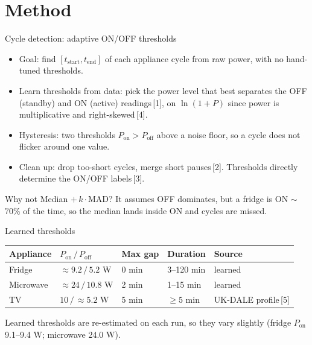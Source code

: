 \section{Method}

\begin{frame}{Cycle detection: adaptive ON/OFF thresholds}
  \small
  \setlength{\itemsep}{2pt}
  \begin{itemize}
    \item \alert{Goal:} find $[t_{\mathrm{start}}, t_{\mathrm{end}}]$ of each
          appliance cycle from raw power, with no hand-tuned thresholds.
    \item \alert{Learn thresholds from data:} pick the power level that best
          separates the OFF (standby) and ON (active) readings\,[1], on
          $\ln(1+P)$ since power is multiplicative and right-skewed\,[4].
    \item \alert{Hysteresis:} two thresholds $P_{\mathrm{on}} > P_{\mathrm{off}}$
          above a noise floor, so a cycle does not flicker around one value.
    \item \alert{Clean up:} drop too-short cycles, merge short pauses\,[2].
          Thresholds directly determine the ON/OFF labels\,[3].
  \end{itemize}

  \vspace{0.15cm}
  \footnotesize
  \parbox{0.86\textwidth}{\alert{Why not Median $+\,k\cdot$MAD?} It assumes OFF dominates, but a fridge
  is ON $\sim$70\% of the time, so the median lands inside ON and cycles are
  missed.}
\end{frame}

\begin{frame}{Learned thresholds}
  \small
  \renewcommand{\arraystretch}{1.5}
  \begin{tabular}{L{0.16\textwidth}|L{0.22\textwidth}|L{0.14\textwidth}|L{0.16\textwidth}|L{0.2\textwidth}}
    \textbf{Appliance} & \textbf{$P_{\mathrm{on}}\,/\,P_{\mathrm{off}}$}
      & \textbf{Max gap} & \textbf{Duration} & \textbf{Source} \\
    \hline
    Fridge & $\approx 9.2\,/\,5.2$ W & 0 min & 3--120 min & learned \\
    Microwave & $\approx 24\,/\,10.8$ W & 2 min & 1--15 min & learned \\
    TV & $10\,/\,\approx 5.2$ W & 5 min & $\geq 5$ min & UK-DALE profile\,[5] \\
  \end{tabular}

  \vspace{0.3cm}
  \footnotesize Learned thresholds are re-estimated on each run, so they vary
  slightly (fridge $P_{\mathrm{on}}$ 9.1--9.4 W; microwave 24.0 W).
\end{frame}

